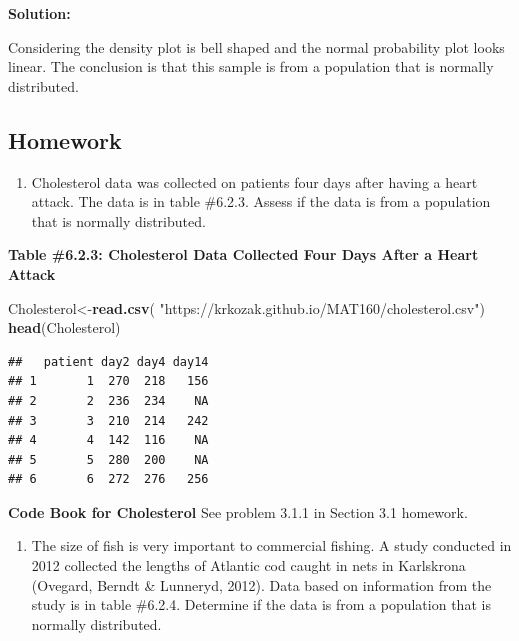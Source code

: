 \documentclass[
]{book}
\newenvironment{Shaded}{\begin{snugshade}}{\end{snugshade}}
\newcommand{\KeywordTok}[1]{\textcolor[rgb]{0.13,0.29,0.53}{\textbf{#1}}}
\newcommand{\NormalTok}[1]{#1}
\newcommand{\StringTok}[1]{\textcolor[rgb]{0.31,0.60,0.02}{#1}}
\providecommand{\tightlist}{%
  \setlength{\itemsep}{0pt}\setlength{\parskip}{0pt}}
\begin{document}
\textbf{Solution:}

Considering the density plot is bell shaped and the normal probability plot looks linear. The conclusion is that this sample is from a population that is normally distributed.

\hypertarget{homework-1}{%
\subsection{Homework}\label{homework-1}}

\begin{enumerate}
\def\labelenumi{\arabic{enumi}.}
\tightlist
\item
  Cholesterol data was collected on patients four days after having a heart attack. The data is in table \#6.2.3. Assess if the data is from a population that is normally distributed.
\end{enumerate}

\textbf{Table \#6.2.3: Cholesterol Data Collected Four Days After a Heart Attack}

\begin{Shaded}
\begin{Highlighting}[]
\NormalTok{Cholesterol<-}\KeywordTok{read.csv}\NormalTok{(}
  \StringTok{"https://krkozak.github.io/MAT160/cholesterol.csv"}\NormalTok{)}
\KeywordTok{head}\NormalTok{(Cholesterol)}
\end{Highlighting}
\end{Shaded}

\begin{verbatim}
##   patient day2 day4 day14
## 1       1  270  218   156
## 2       2  236  234    NA
## 3       3  210  214   242
## 4       4  142  116    NA
## 5       5  280  200    NA
## 6       6  272  276   256
\end{verbatim}

\textbf{Code Book for Cholesterol} See problem 3.1.1 in Section 3.1 homework.

\begin{enumerate}
\def\labelenumi{\arabic{enumi}.}
\setcounter{enumi}{1}
\tightlist
\item
  The size of fish is very important to commercial fishing. A study conducted in 2012 collected the lengths of Atlantic cod caught in nets in Karlskrona (Ovegard, Berndt \& Lunneryd, 2012). Data based on information from the study is in table \#6.2.4. Determine if the data is from a population that is normally distributed.
\end{enumerate}
\end{document}
